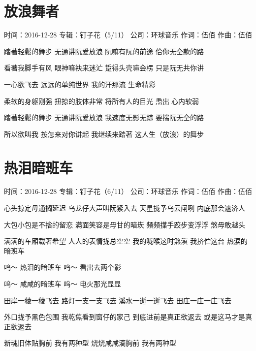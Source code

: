 \documentclass[UTF8,a4paper,oneside,twocolumn,12pt]{ctexbook}
\newcommand{\infopair}[2]{\textbullet #1：#2}
\newcommand{\zc}[1][伍佰]{\infopair{作词}{#1}}
\newcommand{\zq}[1][伍佰]{\infopair{作曲}{#1}}
\newcommand{\zj}[1]{\infopair{专辑}{#1}}
\newcommand{\sj}[1]{\infopair{时间}{#1}}
\newcommand{\gs}[1]{\infopair{公司}{#1}}
\newenvironment{info}{\begin{flushleft}\kaishu
	}
	{\end{flushleft}\normalsize\yahei\par}
\newenvironment{lyric}{
	}
{}
\begin{document}
\section{放浪舞者}
\begin{info}
	\sj{2016-12-28}
	\zj{钉子花（5/11）}
	\gs{环球音乐}
	\zc
	\zq
\end{info}
\begin{lyric}
	踏著轻鬆的舞步
	无通讲阮爱放浪
	阮嘛有阮的前途
	佮你无仝款的路

	看著我脚手有风
	眼神嘛袂来迷汒
	踅得头壳嘛会楞
	只是阮无共你讲

	一心欲飞去 远远的单纯世界
	我的汗那流 生命精彩

	柔软的身躯刚强
	扭掠的肢体非常
	将所有人的目光
	𤆬出𪜶心内软弱

	踏著轻鬆的舞步
	无通讲阮爱放浪
	我速度无影无踪
	要揣阮无仝的路

	所以欲叫我 按怎来对你讲起
	我继续来踏著 这人生（放浪）的舞步
\end{lyric}

\section{热泪暗班车}
\begin{info}
	\sj{2016-12-28}
	\zj{钉子花（6/11）}
	\gs{环球音乐}
	\zc
	\zq
\end{info}
\begin{lyric}
	心头掠定毋通搁延迟
	乌龙仔大声叫阮紧入去
	天星拢予乌云闸咧
	内底那会遮济人

	大包小包是不捨的留恋
	满面笑容是毋甘的暗崁
	频频擛手跤步变浮浮
	煞毋敢越头

	满满的车厢载著希望
	人人的表情拢总空空
	我的咙喉这时煞滇
	我挤伫这台 热涙的暗班车

	呜～ 热泪的暗班车
	呜～ 看出去两个影

	呜～ 咸咸的暗班车
	呜～ 电火那光显显

	田岸一稜一稜飞去
	路灯一支一支飞去
	溪水一逝一逝飞去
	田庄一庄一庄飞去

	外口拢予黑色包围
	我乾焦看到窗仔的家己
	到底进前是真正欲返去
	或是这马才是真正欲返去

	新魂旧体贴胸前 我有两种型
	烧烧咸咸滴胸前 我有两种型
\end{lyric}
\end{document}
